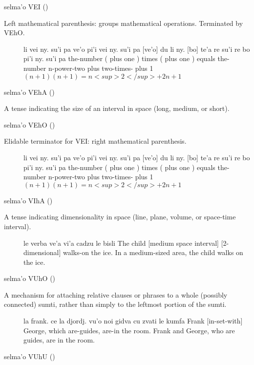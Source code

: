 selma'o VEI () 

Left mathematical parenthesis: groups mathematical
    operations. Terminated by VEhO.
\begin{description}
\item[] li vei ny. su'i pa ve'o pi'i vei ny. su'i pa [ve'o] du li ny. [bo] te'a re su'i re bo pi'i ny. su'i pa the-number (  plus one ) times (  plus one ) equals the-number n-power-two plus two-times- plus 1 $(n + 1)(n + 1) = n<sup>2</sup> + 2n + 1$
\end{description}

selma'o VEhA () 

A tense indicating the size of an interval in space (long,
    medium, or short).

selma'o VEhO ()

Elidable terminator for VEI: right mathematical
    parenthesis.
\begin{description}
\item[] li vei ny. su'i pa ve'o pi'i vei ny. su'i pa [ve'o] du li ny. [bo] te'a re su'i re bo pi'i ny. su'i pa the-number (  plus one ) times (  plus one ) equals the-number n-power-two plus two-times- plus 1 $(n + 1)(n + 1) = n<sup>2</sup> + 2n + 1$
\end{description}

selma'o VIhA () 

A tense indicating dimensionality in space (line, plane,
    volume, or space-time interval).
\begin{description}
\item[] le verba ve'a vi'a cadzu le bisli The child [medium space interval] [2-dimensional] walks-on the ice. In a medium-sized area, the child walks on the ice.
\end{description}

selma'o VUhO () 

A mechanism for attaching relative clauses or phrases to a
    whole (possibly connected) sumti, rather than simply to the
    leftmost portion of the sumti.
\begin{description}
\item[] la frank. ce la djordj. vu'o noi gidva cu zvati le kumfa Frank [in-set-with] George, which are-guides, are-in the room. Frank and George, who are guides, are in the room.
\end{description}

selma'o VUhU () 

